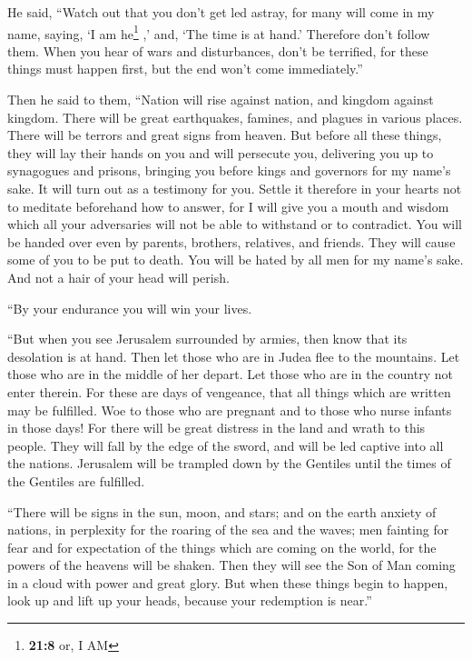  He said, ``Watch out that you don't get led astray, for
many will come in my name, saying, `I am he\footnote{\textbf{21:8} or, I
  AM} ,' and, `The time is at hand.' Therefore don't follow them.
 When you hear of wars and disturbances, don't be
terrified, for these things must happen first, but the end won't come
immediately.''

 Then he said to them, ``Nation will rise against nation,
and kingdom against kingdom.  There will be great
earthquakes, famines, and plagues in various places. There will be
terrors and great signs from heaven.  But before all
these things, they will lay their hands on you and will persecute you,
delivering you up to synagogues and prisons, bringing you before kings
and governors for my name's sake.  It will turn out as a
testimony for you.  Settle it therefore in your hearts
not to meditate beforehand how to answer,  for I will
give you a mouth and wisdom which all your adversaries will not be able
to withstand or to contradict.  You will be handed over
even by parents, brothers, relatives, and friends. They will cause some
of you to be put to death.  You will be hated by all men
for my name's sake.  And not a hair of your head will
perish.

 ``By your endurance you will win your lives.

 ``But when you see Jerusalem surrounded by armies, then
know that its desolation is at hand.  Then let those who
are in Judea flee to the mountains. Let those who are in the middle of
her depart. Let those who are in the country not enter therein.
 For these are days of vengeance, that all things which
are written may be fulfilled.  Woe to those who are
pregnant and to those who nurse infants in those days! For there will be
great distress in the land and wrath to this people. 
They will fall by the edge of the sword, and will be led captive into
all the nations. Jerusalem will be trampled down by the Gentiles until
the times of the Gentiles are fulfilled.

 ``There will be signs in the sun, moon, and stars; and
on the earth anxiety of nations, in perplexity for the roaring of the
sea and the waves;  men fainting for fear and for
expectation of the things which are coming on the world, for the powers
of the heavens will be shaken.  Then they will see the
Son of Man coming in a cloud with power and great glory. 
But when these things begin to happen, look up and lift up your heads,
because your redemption is near.''

